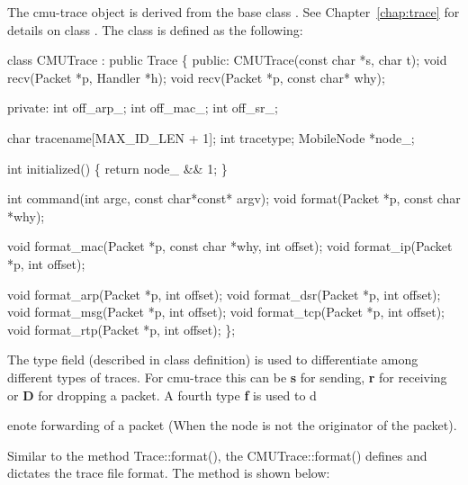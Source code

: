The cmu-trace object  is derived from the base class . See Chapter~\ref{chap:trace} for details on class . The class  is defined as the following:

\begin{program}
class CMUTrace : public Trace \{
public:
	CMUTrace(const char *s, char t);
	void	recv(Packet *p, Handler *h);
	void	recv(Packet *p, const char* why);

private:
	int off_arp_;
	int off_mac_;
	int off_sr_;

	char	tracename[MAX_ID_LEN + 1];
        int     tracetype;
        MobileNode *node_;

        int initialized() \{ return node_ && 1; \}

	int	command(int argc, const char*const* argv);
	void	format(Packet *p, const char *why);

	void	format_mac(Packet *p, const char *why, int offset);
	void	format_ip(Packet *p, int offset);

	void	format_arp(Packet *p, int offset);
	void	format_dsr(Packet *p, int offset);
	void	format_msg(Packet *p, int offset);
	void	format_tcp(Packet *p, int offset);
	void	format_rtp(Packet *p, int offset);
\};
\end{program}

The type field (described in  class definition) is used to differentiate among different types of traces. For cmu-trace this can be {\bf s} for sending, {\bf r} for receiving or {\bf D} for dropping a packet. A fourth type {\bf f} is used to d









enote forwarding of a packet (When the node is not the originator of the packet).

Similar to the method Trace::format(), the CMUTrace::format() defines and dictates the trace file format. The method is shown below:

